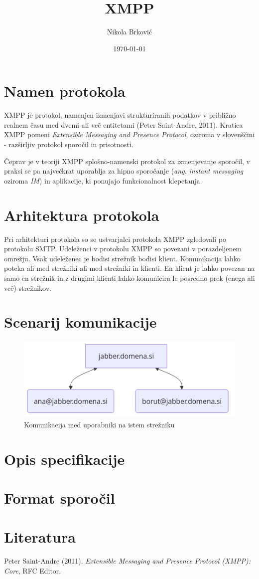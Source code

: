 \documentclass[11pt]{article}
\author{Nikola Brković}
\date{\today}
\title{XMPP}
\begin{document}
\maketitle

\section{Namen protokola}
\label{sec:orga104b8d}

XMPP je protokol, namenjen izmenjavi strukturiranih podatkov v
približno realnem času med dvemi ali več entitetami
(Peter Saint-Andre, 2011). Kratica XMPP pomeni \emph{Extensible Messaging and Presence
Protocol}, oziroma v slovenščini - razširljiv protokol sporočil in
prisotnosti.

Čeprav je v teoriji XMPP splošno-namenski protokol za izmenjevanje
sporočil, v praksi se pa največkrat uporablja za hipno sporočanje
(\emph{ang.} \emph{instant messaging} oziroma \emph{IM}) in aplikacije, ki ponujajo
funkcionalnost klepetanja.

\section{Arhitektura protokola}
\label{sec:orgeb26036}

Pri arhitekturi protokola so se ustvarjalci protokola XMPP zgledovali
po protokolu SMTP. Udeleženci v protokolu XMPP so povezani v
porazdeljenem omrežju. Vsak udeleženec je bodisi strežnik bodisi
klient. Komunikacija lahko poteka ali med strežniki ali med strežniki
in klienti. En klient je lahko povezan na samo en strežnik in z
drugimi klienti lahko komunicira le posredno prek (enega ali več)
strežnikov.

\section{Scenarij komunikacije}
\label{sec:orgffc1df0}

\begin{figure}[H]
\centering
\includegraphics[width=.9\linewidth]{images/local-server.png}
\caption{Komunikacija med uporabniki na istem strežniku}
\end{figure}

\section{Opis specifikacije}
\label{sec:orga3ffc1d}

\section{Format sporočil}
\label{sec:org8d97a4a}

\section{Literatura}
\label{sec:org096abc8}

\noindent
Peter Saint-Andre (2011). \emph{{Extensible Messaging and Presence Protocol (XMPP): Core}}, RFC Editor.
\end{document}
